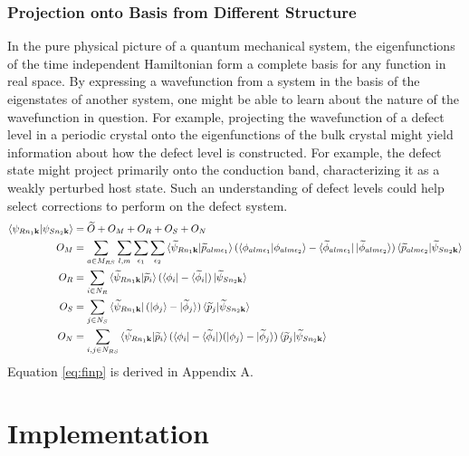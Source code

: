 \documentclass[12pt]{article}
\begin{document}
\subsubsection{Projection onto Basis from Different Structure}
In the pure physical picture of a quantum mechanical system, the eigenfunctions of the time
independent Hamiltonian form a complete basis for any function in real space. By expressing
a wavefunction from a system in the basis of the eigenstates of another system, one might
be able to learn about the nature of the wavefunction in question. For example, projecting
the wavefunction of a defect level in a periodic crystal onto the eigenfunctions of the
bulk crystal might yield information about how the defect level is constructed. For example,
the defect state might project primarily onto the conduction band, characterizing it
as a weakly perturbed host state. Such an understanding of defect levels could help select
corrections to perform on the defect system.\cite{lany}
\begin{equation}
\centering
\begin{split}
\braket{\psi_{Rn_1\mathbf{k}}|\psi_{Sn_2\mathbf{k}}} & =\widetilde{O}+O_M+O_R+O_S+O_N\\
O_M & =\sum_{a\in M_{RS}}\sum_{l,m}\sum_{\epsilon_1}\sum_{\epsilon_2}
\braket{\widetilde{\psi}_{Rn_1\mathbf{k}}|\widetilde{p}_{a\ind _1}}
(\braket{\phi_{a\ind _1}|{\phi_{a\ind _2}}}
-\bra{\widetilde{\phi}_{a\ind _1}}\ket{\widetilde{\phi}_{a\ind _2}})
\braket{\widetilde{p}_{a\ind _2}|\widetilde{\psi}_{Sn_2\mathbf{k}}}\\
O_R & =\sum_{i\in N_R}\braket{\widetilde{\psi}_{Rn_1\mathbf{k}}|\widetilde{p}_i}
(\bra{\phi_i}-\bra{\widetilde{\phi}_i})
\ket{\widetilde{\psi}_{Sn_2\mathbf{k}}}\\
O_S & =\sum_{j\in N_S}\bra{\widetilde{\psi}_{Rn_1\mathbf{k}}}(\ket{\phi_j}-\ket{\widetilde{\phi}_j})
\braket{\widetilde{p}_j|\widetilde{\psi}_{Sn_2\mathbf{k}}}\\
O_N & =\sum_{i,j\in N_{RS}}\braket{\widetilde{\psi}_{Rn_1\mathbf{k}}|
\widetilde{p}_i}(\bra{\phi_i}-\bra{\widetilde{\phi}_i})
(\ket{\phi_j}-\ket{\widetilde{\phi}_j})\braket{\widetilde{p}_j|\widetilde{\psi}_{Sn_2\mathbf{k}}}
\end{split}
\label{eq:finp}
\end{equation}
Equation \ref{eq:finp} is derived in Appendix A.

\section{Implementation}
\end{document}
